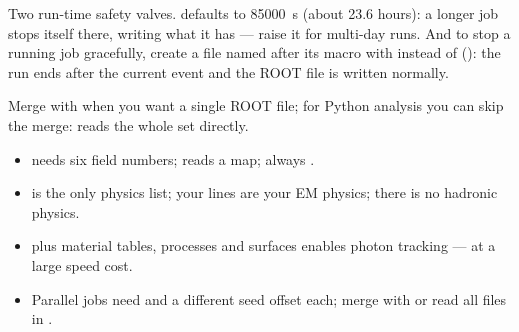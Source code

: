 \begin{tip}
Two run-time safety valves.  defaults to \SI{85000}{s} (about 23.6 hours): a longer job stops itself there, writing what it has --- raise it for multi-day runs. And to stop a running job gracefully, create a file named after its macro with  instead of  (): the run ends after the current event and the ROOT file is written normally.
\end{tip}

\begin{tip}
Merge with  when you want a single ROOT file; for Python analysis you can skip the merge:  reads the whole set directly.
\end{tip}

\begin{recap}
\begin{itemize}
  \item {} needs six field numbers;  reads a map; always .
  \item {} is the only physics list; your  lines are your EM physics; there is no hadronic physics.
  \item {} plus material tables, processes and surfaces enables photon tracking --- at a large speed cost.
  \item Parallel jobs need  and a different seed offset each; merge with  or read all files in .
\end{itemize}
\end{recap}
